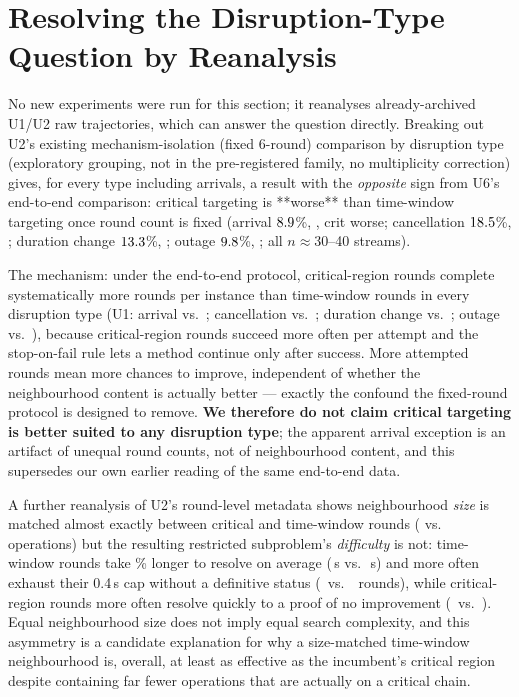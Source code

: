 \documentclass[letterpaper]{article} %
\begin{document}
\section{Resolving the Disruption-Type Question by Reanalysis}
\label{sec:timewindow}

No new experiments were run for this section; it reanalyses already-archived U1/U2 raw trajectories, which can answer the question directly. Breaking out U2's existing mechanism-isolation (fixed 6-round) comparison by disruption type (exploratory grouping, not in the pre-registered family, no multiplicity correction) gives, for every type including arrivals, a result with the \emph{opposite} sign from U6's end-to-end comparison: critical targeting is **worse** than time-window targeting once round count is fixed (arrival $8.9$\%, \MechTwoArrivalWL, crit worse; cancellation $18.5$\%, \MechTwoCancellationWL; duration change $13.3$\%, \MechTwoDurationWL; outage $9.8$\%, \MechTwoOutageWL; all $n\approx$30--40 streams).

The mechanism: under the end-to-end protocol, critical-region rounds complete systematically more rounds per instance than time-window rounds in every disruption type (U1: arrival \RoundsUOneArrivalCrit{} vs.\ \RoundsUOneArrivalTw; cancellation \RoundsUOneCancelCrit{} vs.\ \RoundsUOneCancelTw; duration change \RoundsUOneDurationCrit{} vs.\ \RoundsUOneDurationTw; outage \RoundsUOneOutageCrit{} vs.\ \RoundsUOneOutageTw), because critical-region rounds succeed more often per attempt and the stop-on-fail rule lets a method continue only after success. More attempted rounds mean more chances to improve, independent of whether the neighbourhood content is actually better --- exactly the confound the fixed-round protocol is designed to remove. \textbf{We therefore do not claim critical targeting is better suited to any disruption type}; the apparent arrival exception is an artifact of unequal round counts, not of neighbourhood content, and this supersedes our own earlier reading of the same end-to-end data.

A further reanalysis of U2's round-level metadata shows neighbourhood \emph{size} is matched almost exactly between critical and time-window rounds (\MTwoRoundCritN{} vs.\ \MTwoRoundTwN{} operations) but the resulting restricted subproblem's \emph{difficulty} is not: time-window rounds take \MTwoRoundTwVsCritPct\% longer to resolve on average (\MTwoRoundTwSolverS\,s vs.\ \MTwoRoundCritSolverS\,s) and more often exhaust their 0.4\,s cap without a definitive status (\MTwoRoundTwFeas\ vs.\ \MTwoRoundCritFeas\ rounds), while critical-region rounds more often resolve quickly to a proof of no improvement (\MTwoRoundCritInfeas\ vs.\ \MTwoRoundTwInfeas). Equal neighbourhood size does not imply equal search complexity, and this asymmetry is a candidate explanation for why a size-matched time-window neighbourhood is, overall, at least as effective as the incumbent's critical region despite containing far fewer operations that are actually on a critical chain.
\end{document}
